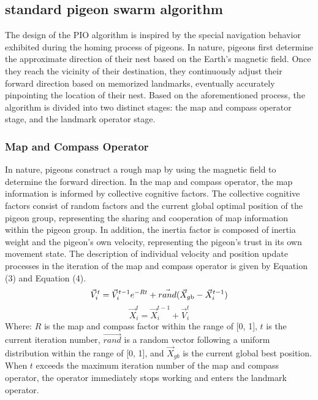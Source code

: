 \documentclass[preprint,review,compress,12pt]{elsarticle}
\begin{document}
\subsection{standard pigeon swarm algorithm}
The design of the PIO algorithm is inspired by the special navigation behavior exhibited during the homing process of pigeons. In nature, pigeons first determine the approximate direction of their nest based on the Earth's magnetic field. Once they reach the vicinity of their destination, they continuously adjust their forward direction based on memorized landmarks, eventually accurately pinpointing the location of their nest. Based on the aforementioned process, the algorithm is divided into two distinct stages: the map and compass operator stage, and the landmark operator stage.
\subsubsection{Map and Compass Operator}
In nature, pigeons construct a rough map by using the magnetic field to determine the forward direction. In the map and compass operator, the map information is informed by collective cognitive factors. The collective cognitive factors consist of random factors and the current global optimal position of the pigeon group, representing the sharing and cooperation of map information within the pigeon group. In addition, the inertia factor is composed of inertia weight and the pigeon's own velocity, representing the pigeon's trust in its own movement state. The description of individual velocity and position update processes in the iteration of the map and compass operator is given by Equation (3) and Equation (4).
\begin{equation}
    \vec{V}_i^t = \vec{V}_i^{t - 1}{e^{ - Rt}} + \vec{rand}({\vec{X}_{g{\rm{b}}}} - \vec{X}_i^{t - 1})
\end{equation}
\begin{equation}
    \vec{X}_i^t = \vec{X}_i^{t - 1} + \vec{V}_i^t
\end{equation}
Where: $R$ is the map and compass factor within the range of [0, 1], $t$ is the current iteration number, $\vec{rand}$ is a random vector following a uniform distribution within the range of [0, 1], and $\vec{X}_{gb}$ is the current global best position. When $t$ exceeds the maximum iteration number of the map and compass operator, the operator immediately stops working and enters the landmark operator.
\end{document}
